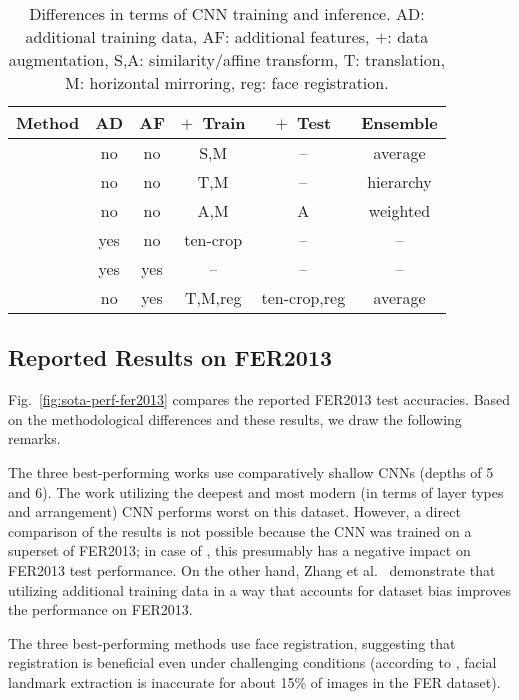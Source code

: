 \documentclass[conference,10pt,a4paper]{IEEEtran}
\begin{document}
\begin{table}[t]
\centering
\caption{Differences in terms of CNN training and inference. AD: additional training data, AF: additional features, $+$: data augmentation, S,A: similarity/affine transform, T: translation, M: horizontal mirroring, reg: face registration.}
\label{tbl:sota_train_test}
\begin{tabular}{cccccc}
    \toprule
    Method & AD & AF & $+$~Train & $+$~Test & Ensemble \\ \midrule
    \cite{tang13} & no & no & S,M & -- & average \\ 
    \cite{kim16} & no & no & T,M & -- & hierarchy \\ 
    \cite{yu15} & no & no & A,M & A & weighted \\
    \cite{mollahosseini15} & yes & no & ten-crop & -- & -- \\
    \cite{zhang2015} & yes & yes & -- & -- & -- \\
    \cite{kim16cvpr} & no & yes & T,M,reg & ten-crop,reg & average \\
    \bottomrule
\end{tabular}
\end{table}

\subsection{Reported Results on FER2013} \label{sub:reported_results_on_fer2013}

Fig.~\ref{fig:sota-perf-fer2013} compares the reported FER2013 test accuracies. Based on the methodological differences and these results, we draw the following remarks.

The three best-performing works use comparatively shallow CNNs (depths of 5 and 6). The work utilizing the deepest and most modern (in terms of layer types and arrangement) CNN \cite{mollahosseini15} performs worst on this dataset. However, a direct comparison of the results is not possible because the CNN was trained on a superset of FER2013; in case of \cite{mollahosseini15}, this presumably has a negative impact on FER2013 test performance. On the other hand, Zhang et al.\ \cite{zhang2015} demonstrate that utilizing additional training data in a way that accounts for dataset bias improves the performance on FER2013.

The three best-performing methods use face registration, suggesting that registration is beneficial even under challenging conditions (according to \cite{zhang2015}, facial landmark extraction is inaccurate for about 15\% of images in the FER dataset).
\end{document}
